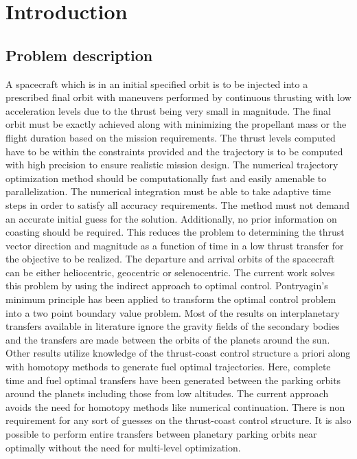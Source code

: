 
\chapter{Introduction}  %

\ifpdf
    \graphicspath{{Chapter1/Figs/Raster/}{Chapter1/Figs/PDF/}{Chapter1/Figs/}}
\else
    \graphicspath{{Chapter1/Figs/Vector/}{Chapter1/Figs/}}
\fi


\section{Problem description}
A spacecraft which is in an initial specified orbit is to be injected into a prescribed final orbit with maneuvers performed by continuous thrusting with low acceleration levels due to the thrust being very small in magnitude. The final orbit must be exactly achieved along with minimizing the propellant mass or the flight duration based on the mission requirements. The thrust levels computed have to be within the constraints provided and the trajectory is to be computed with high precision to ensure realistic mission design. The numerical trajectory optimization method should be computationally fast and easily amenable to parallelization. The numerical integration must be able to take adaptive time steps in order to satisfy all accuracy requirements. The method must not demand an accurate initial guess for the solution. Additionally, no prior information on coasting should be required. This reduces the problem to determining the thrust vector direction and magnitude as a function of time in a low thrust transfer for the objective to be realized. The departure and arrival orbits of the spacecraft can be either heliocentric, geocentric or selenocentric. The current work solves this problem by using the indirect approach to optimal control. Pontryagin's minimum principle has been applied to transform the optimal control problem into a two point boundary value problem. Most of the results on interplanetary transfers available in literature ignore the gravity fields of the secondary bodies and the transfers are made between the orbits of the planets around the sun. Other results utilize knowledge of the thrust-coast control structure a priori along with homotopy methods to generate fuel optimal trajectories. Here, complete time and fuel optimal transfers have been generated between the parking orbits around the planets including those from low altitudes. The current approach avoids the need for homotopy methods like numerical continuation. There is non requirement for any sort of guesses on the thrust-coast control structure. It is also possible to perform entire transfers between planetary parking orbits near optimally without the need for multi-level optimization. 


